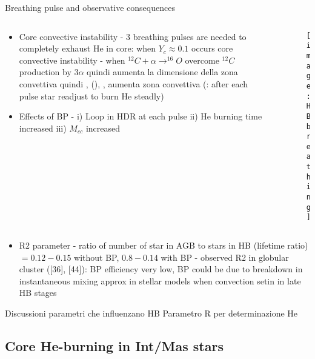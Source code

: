 \begin{frame}{Breathing pulse and observative consequences}
\begin{columns}[T]
	\begin{column}{0.55\textwidth}
	\begin{itemize}
		\item Core convective instability - 3 breathing pulses are needed to completely exhaust He in core: when $Y_c\approx0.1$ occurs core convective instability - when $^{12}C+\alpha\to^{16}O$ overcome $^{12}C$ production by $3\alpha$ \xaumenta{\kappa} quindi aumenta la dimensione della zona convettiva quindi , (), \xaumenta{\nrad}, aumenta zona convettiva (: after each pulse star readjust to burn He steadly)
		\item Effects of BP - i) Loop in HDR at each pulse ii) He burning time increased iii) $M_{cc}$ increased
	\end{itemize}
	\end{column}
	\begin{column}{0.45\textwidth}
	\begin{figure}[!ht]
	\texttt{[image: HBbreathing]}\label{fig:HBbreathing}
	\end{figure}
\end{column}\end{columns}
	\begin{itemize}
	\item R2 parameter - ratio of number of star in AGB to stars in HB (lifetime ratio)  $=0.12-0.15$ without BP, $0.8-0.14$ with BP - observed R2 in globular cluster ([36], [44]): BP efficiency very low, BP could be due to breakdown in instantaneous mixing approx in stellar models when convection setin in late HB stages
\end{itemize}
\end{frame}

\begin{frame}{Discussioni parametri che influenzano HB}
Parametro R per determinazione He
\end{frame}

\subsection{Core He-burning in Int/Mas stars}

